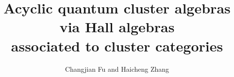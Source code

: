 \documentclass[reqno,12pt]{amsart}
\numberwithin{equation}{section}
\theoremstyle{plain} %
\theoremstyle{definition} %
\begin{document}
\title[Acyclic quantum cluster algebras via Hall algebras]{Acyclic quantum cluster algebras via Hall algebras\\ associated to cluster categories}

\author{Changjian Fu and Haicheng Zhang}
\address{Department of Mathematics\\ SiChuan University\\ Chengdu 610064, P.~R.~China}
\address{Ministry of Education Key Laboratory of NSLSCS, School of Mathematical Sciences, Nanjing Normal University, Nanjing 210023, P.R.China}


%
\end{document}
